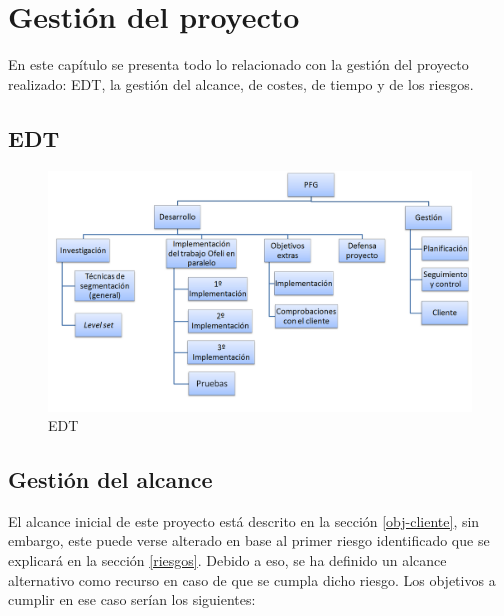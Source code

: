 \chapter{Gesti\'{o}n del proyecto}

En este cap\'{i}tulo se presenta todo lo relacionado con la gesti\'{o}n del proyecto realizado: EDT, la gesti\'{o}n del alcance, de costes, de tiempo y de los riesgos.

\section{EDT}

\begin{figure}[H]
	\captionsetup{justification=centering}
	\centering
	\includegraphics[width=1.2\textwidth]{./imagenes/EDT}
	\caption{EDT}	
	\label{EDT}
\end{figure}


\section{Gesti\'{o}n del alcance}\label{alcance}
 
El alcance inicial de este proyecto est\'{a} descrito en la secci\'{o}n \ref{obj-cliente}, sin embargo, este puede verse alterado en base al primer riesgo identificado que se explicar\'{a} en la secci\'{o}n \ref{riesgos}. Debido a eso, se ha definido un alcance alternativo como recurso en caso de que se cumpla dicho riesgo. Los objetivos a cumplir en ese caso ser\'{i}an los siguientes:


